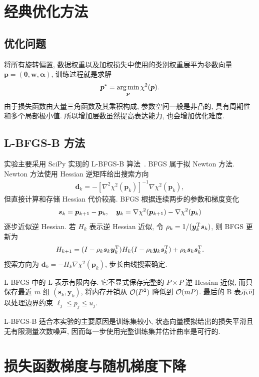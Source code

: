 \documentclass[a4paper]{ctexart}
\begin{document}
\section{经典优化方法}

\subsection{优化问题}

将所有旋转偏置, 数据权重以及加权损失中使用的类别权重展平为参数向量 $\bm{p}=(\bm{\theta}, \bm{w}, \bm{\alpha})$, 训练过程就是求解
\begin{align}
    \bm{p}^\ast=\operatorname*{arg\,min}_{\bm{p}}\chi^2(\bm{p}).
\end{align}
由于损失函数由大量三角函数及其乘积构成, 参数空间一般是非凸的, 具有周期性和多个局部极小值. 所以增加层数虽然提高表达能力, 也会增加优化难度.

\subsection{L-BFGS-B 方法}

实验主要采用 SciPy 实现的 L-BFGS-B 算法~\cite{byrd1995lbfgsb}. BFGS 属于拟 Newton 方法. Newton 方法使用 Hessian 逆矩阵给出搜索方向
\begin{align}
    \bm{d}_k=-[\nabla^2\chi^2(\bm{p}_k)]^{-1}\nabla\chi^2(\bm{p}_k),
\end{align}
但直接计算和存储 Hessian 代价较高. BFGS 根据连续两步的参数和梯度变化
\begin{align}
    \bm{s}_k=\bm{p}_{k+1}-\bm{p}_k, \quad \bm{y}_k=\nabla\chi^2(\bm{p}_{k+1})-\nabla\chi^2(\bm{p}_k)
\end{align}
逐步近似逆 Hessian. 若 $H_k$ 表示逆 Hessian 近似, 令 $\rho_k=1/(\bm{y}_k^{\mathrm{T}}\bm{s}_k)$, 则 BFGS 更新为
\begin{align}
    H_{k+1}=(I-\rho_k\bm{s}_k\bm{y}_k^{\mathrm{T}})H_k(I-\rho_k\bm{y}_k\bm{s}_k^{\mathrm{T}})+\rho_k\bm{s}_k\bm{s}_k^{\mathrm{T}}.
\end{align}
搜索方向为 $\bm{d}_k=-H_k\nabla\chi^2(\bm{p}_k)$, 步长由线搜索确定.

L-BFGS 中的 L 表示有限内存. 它不显式保存完整的 $P\times P$ 逆 Hessian 近似, 而只保存最近 $m$ 组 $(\bm{s}_k, \bm{y}_k)$, 将内存开销从 $\mathcal{O}(P^2)$ 降低到 $\mathcal{O}(mP)$. 最后的 B 表示可以处理边界约束 $\ell_j\le p_j \le u_j$.

L-BFGS-B 适合本实验的主要原因是训练集较小, 状态向量模拟给出的损失平滑且无有限测量次数噪声, 因而每一步使用完整训练集并估计曲率是可行的.

\section{损失函数梯度与随机梯度下降}
\end{document}
